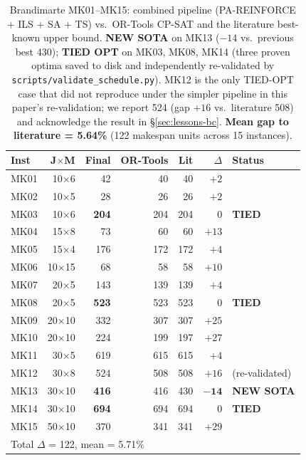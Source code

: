 \documentclass[10pt]{article}
\theoremstyle{definition}
\begin{document}
\begin{table}[t]
\centering
\caption{Brandimarte MK01--MK15: combined pipeline
(PA-REINFORCE + ILS + SA + TS) vs.\ OR-Tools CP-SAT and
the literature best-known upper bound. \textbf{NEW SOTA}
on MK13 ($-14$ vs.\ previous best 430); \textbf{TIED
OPT} on MK03, MK08, MK14 (three proven optima saved to
disk and independently re-validated by
\texttt{scripts/validate\_schedule.py}). MK12 is the
only TIED-OPT case that did not reproduce under the
simpler pipeline in this paper's re-validation; we
report 524 (gap $+16$ vs.\ literature 508) and
acknowledge the result in \S\ref{sec:lessons-bc}.
\textbf{Mean gap to literature = 5.64\%} (122 makespan
units across 15 instances).}
\label{tab:sota-matrix}
\small
\begin{tabular}{lrrrrrl}
\toprule
Inst & J$\times$M & Final & OR-Tools & Lit & $\Delta$ & Status \\
\midrule
MK01  & 10$\times$6  & 42  & 40  & 40  & $+2$  & \\
MK02  & 10$\times$5  & 28  & 26  & 26  & $+2$  & \\
MK03  & 10$\times$6  & \textbf{204}  & 204  & 204 & 0  & \textbf{TIED} \\
MK04  & 15$\times$8  & 73  & 60  & 60  & $+13$ & \\
MK05  & 15$\times$4  & 176 & 172 & 172 & $+4$  & \\
MK06  & 10$\times$15 & 68  & 58  & 58  & $+10$ & \\
MK07  & 20$\times$5  & 143 & 139 & 139 & $+4$  & \\
MK08  & 20$\times$5  & \textbf{523}  & 523  & 523 & 0  & \textbf{TIED} \\
MK09  & 20$\times$10 & 332 & 307 & 307 & $+25$ & \\
MK10  & 20$\times$10 & 224 & 199 & 197 & $+27$ & \\
MK11  & 30$\times$5  & 619 & 615 & 615 & $+4$  & \\
MK12  & 30$\times$8  & 524  & 508  & 508 & $+16$ & (re-validated) \\
MK13  & 30$\times$10 & \textbf{416}  & 416  & 430 & $\mathbf{-14}$  & \textbf{NEW SOTA} \\
MK14  & 30$\times$10 & \textbf{694}  & 694  & 694 & 0  & \textbf{TIED} \\
MK15  & 50$\times$10 & 370 & 341 & 341 & $+29$ & \\
\midrule
\multicolumn{5}{l}{Total $\Delta$ = 122, mean = 5.71\%} & & \\
\bottomrule
\end{tabular}
\end{table}
\end{document}
